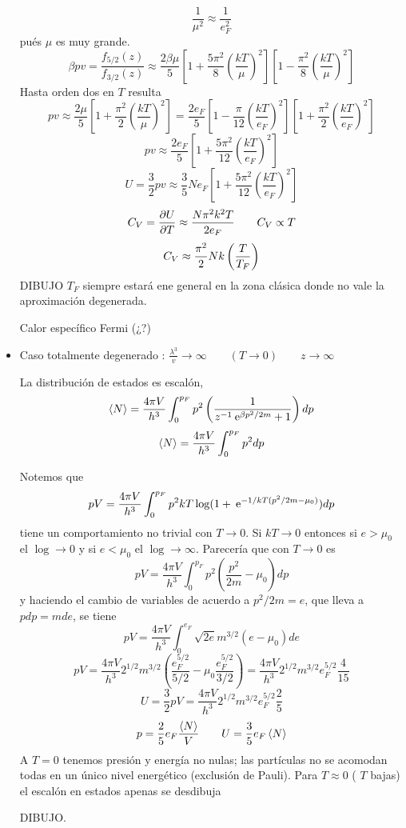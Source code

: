 \documentclass[10pt,oneside]{CBFT_book}
\begin{document}
\begin{itemize}
 \[
	\frac{1}{\mu^2} \approx \frac{1}{e_F^2}
 \]
 pués $ \mu $ es muy grande.
 \[
	\beta p v = \frac{ f_{5/2}(z) }{ f_{3/2}(z) } \approx \frac{ 2 \beta \mu }{ 5 } 
	\left[ 1 + \frac{ 5\pi^2 }{ 8 } \left( \frac{kT}{\mu} \right)^2 \right]
	\left[ 1 - \frac{ \pi^2 }{ 8 } \left( \frac{kT}{\mu} \right)^2 \right]
 \]
 Hasta orden dos en $ T $ resulta 
 \[
	pv \approx \frac{ 2 \mu }{ 5 } \left[ 1 + \frac{ \pi^2 }{ 2 } \left( \frac{kT}{\mu} \right)^2 \right] =
	\frac{ 2 e_F }{ 5 }\left[ 1 - \frac{ \pi }{ 12 } \left( \frac{kT}{e_F} \right)^2 \right] 
	\left[ 1 + \frac{ \pi^2 }{ 2 } \left( \frac{kT}{e_F} \right)^2 \right] 
 \]
 \[
	pv \approx \frac{ 2 e_F }{ 5 } \left[ 1 + \frac{ 5 \pi^2 }{ 12 } \left( \frac{kT}{e_F} \right)^2 \right] 
 \]
 \[
	U = \frac{3}{2} p v \approx \frac{3}{5} N e_F 
	\left[ 1 + \frac{ 5 \pi^2 }{ 12 } \left( \frac{kT}{e_F} \right)^2 \right] 
 \]
 \[
	C_V = \frac{\partial^{\hspace{-0.05em}} {U}}{\partial {T}^{\hspace{-0.05em}}} \approx \frac{ N \pi^2 k^2 T }{ 2e_F } \qquad C_V \propto T
 \]
 \[
	C_V \approx \frac{\pi^2}{2} Nk \left( \frac{ T }{ T_F } \right)
 \]
 DIBUJO 
 $T_F$ siempre estará ene general en la zona clásica donde no vale la aproximación degenerada.
 
 Calor específico Fermi (¿?)
 \item Caso totalmente degenerado : $\frac{\lambda^3}{v} \to \infty \qquad (T \to 0) \qquad z \to \infty $
 
 La distribución de estados es escalón,
 \[
	\braket{N} = \frac{ 4 \pi V }{ h^3 } \int_0^{p_F} p^2 \left( \frac{  1  }{  z^{-1} \:\mathrm{e}^{\beta p^2 / 2m } + 1 } \right) dp
 \]
 \[
	\braket{N} = \frac{ 4 \pi V }{ h^3 } \int_0^{p_F} p^2 dp
 \]
 
 Notemos que 
 \[
	pV = \frac{ 4 \pi V }{ h^3 } \int_0^{p_F} p^2 kT \log (1 + \:\mathrm{e}^{ -1/kT( p^2/2m - \mu_0 )} ) dp
 \]
 tiene un comportamiento no trivial con $ T \to 0 $. Si $ kT \to 0 $ entonces si $e > \mu_0$ el $\log \to 0$
 y si $e < \mu_0$ el $\log \to \infty $.
 Parecería que con $ T \to 0 $ es
 \[
 	pV = \frac{ 4 \pi V }{ h^3 } \int_0^{p_F} p^2 \left( \frac{ p^2 }{ 2m } - \mu_0 \right) dp
 \]
 y haciendo el cambio de variables de acuerdo a $ p^2 / 2m = e $, que lleva a $ pdp = m de $, se tiene 
 \[
 	pV = \frac{ 4 \pi V }{ h^3 } \int_0^{e_F} \sqrt{2e} m^{3/2} ( e -\mu_0 ) de
 \]
 \[
	pV = \frac{ 4 \pi V }{ h^3 } 2^{ 1/2 } m^{ 3/2 } 
	\left( \frac{e_F^{ 5/2 }}{5/2} - \mu_0 \frac{e_F^{ 5/2 }}{3/2} \right) =
	\frac{ 4 \pi V }{ h^3 }2^{ 1/2 } m^{ 3/2 } e_F^{ 5/2 } \frac{ 4 }{ 15 }
 \]
 \[
	U = \frac{3}{2} p V = \frac{ 4 \pi V }{ h^3 }2^{ 1/2 } m^{ 3/2 } e_F^{ 5/2 } \frac{ 2 }{ 5 }
 \]
 \[
	p = \frac{2}{5} e_F \frac{\braket{N}}{V} \qquad U = \frac{3}{5} e_F \braket{N} 
 \]
 A $ T = 0 $ tenemos presión y energía no nulas; las partículas no se acomodan todas en un único nivel energético
 (exclusión de Pauli).
 Para $ T \approx 0 $ ( $T$ bajas) el escalón en estados apenas se desdibuja
 
 DIBUJO.
 
\end{itemize}
\end{document}
